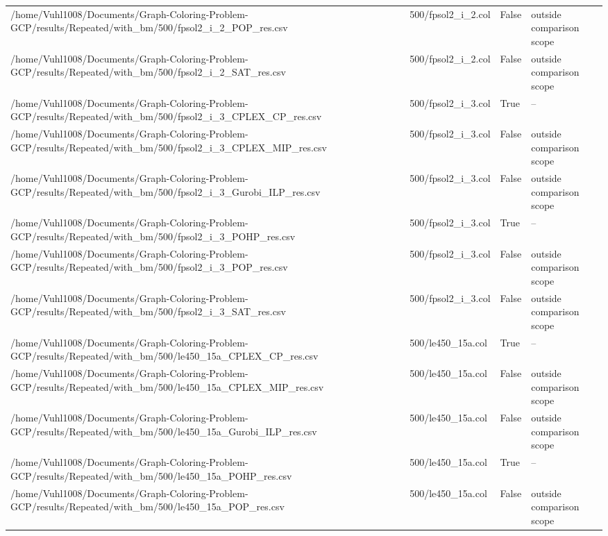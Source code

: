 \begin{table}[htbp]
\begin{tabular}{llll}
/home/Vuhl1008/Documents/Graph-Coloring-Problem-GCP/results/Repeated/with\_bm/500/fpsol2\_i\_2\_POP\_res.csv & 500/fpsol2\_i\_2.col & False & outside comparison scope \\
/home/Vuhl1008/Documents/Graph-Coloring-Problem-GCP/results/Repeated/with\_bm/500/fpsol2\_i\_2\_SAT\_res.csv & 500/fpsol2\_i\_2.col & False & outside comparison scope \\
/home/Vuhl1008/Documents/Graph-Coloring-Problem-GCP/results/Repeated/with\_bm/500/fpsol2\_i\_3\_CPLEX\_CP\_res.csv & 500/fpsol2\_i\_3.col & True & -- \\
/home/Vuhl1008/Documents/Graph-Coloring-Problem-GCP/results/Repeated/with\_bm/500/fpsol2\_i\_3\_CPLEX\_MIP\_res.csv & 500/fpsol2\_i\_3.col & False & outside comparison scope \\
/home/Vuhl1008/Documents/Graph-Coloring-Problem-GCP/results/Repeated/with\_bm/500/fpsol2\_i\_3\_Gurobi\_ILP\_res.csv & 500/fpsol2\_i\_3.col & False & outside comparison scope \\
/home/Vuhl1008/Documents/Graph-Coloring-Problem-GCP/results/Repeated/with\_bm/500/fpsol2\_i\_3\_POHP\_res.csv & 500/fpsol2\_i\_3.col & True & -- \\
/home/Vuhl1008/Documents/Graph-Coloring-Problem-GCP/results/Repeated/with\_bm/500/fpsol2\_i\_3\_POP\_res.csv & 500/fpsol2\_i\_3.col & False & outside comparison scope \\
/home/Vuhl1008/Documents/Graph-Coloring-Problem-GCP/results/Repeated/with\_bm/500/fpsol2\_i\_3\_SAT\_res.csv & 500/fpsol2\_i\_3.col & False & outside comparison scope \\
/home/Vuhl1008/Documents/Graph-Coloring-Problem-GCP/results/Repeated/with\_bm/500/le450\_15a\_CPLEX\_CP\_res.csv & 500/le450\_15a.col & True & -- \\
/home/Vuhl1008/Documents/Graph-Coloring-Problem-GCP/results/Repeated/with\_bm/500/le450\_15a\_CPLEX\_MIP\_res.csv & 500/le450\_15a.col & False & outside comparison scope \\
/home/Vuhl1008/Documents/Graph-Coloring-Problem-GCP/results/Repeated/with\_bm/500/le450\_15a\_Gurobi\_ILP\_res.csv & 500/le450\_15a.col & False & outside comparison scope \\
/home/Vuhl1008/Documents/Graph-Coloring-Problem-GCP/results/Repeated/with\_bm/500/le450\_15a\_POHP\_res.csv & 500/le450\_15a.col & True & -- \\
/home/Vuhl1008/Documents/Graph-Coloring-Problem-GCP/results/Repeated/with\_bm/500/le450\_15a\_POP\_res.csv & 500/le450\_15a.col & False & outside comparison scope \\

\end{tabular}
\end{table}
